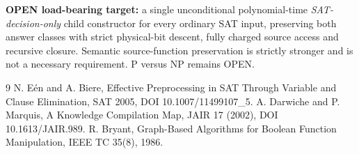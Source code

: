 \documentclass[11pt]{article}
\begin{document}
\noindent\textbf{OPEN load-bearing target:} a single unconditional polynomial-time \emph{SAT-decision-only} child constructor for every ordinary SAT input, preserving both answer classes with strict physical-bit descent, fully charged source access and recursive closure. Semantic source-function preservation is strictly stronger and is not a necessary requirement. P versus NP remains OPEN.

\begin{thebibliography}{9}
 N. E\'en and A. Biere, Effective Preprocessing in SAT Through Variable and Clause Elimination, SAT 2005, DOI 10.1007/11499107\_5.
 A. Darwiche and P. Marquis, A Knowledge Compilation Map, JAIR 17 (2002), DOI 10.1613/JAIR.989.
 R. Bryant, Graph-Based Algorithms for Boolean Function Manipulation, IEEE TC 35(8), 1986.
\end{thebibliography}
\end{document}
